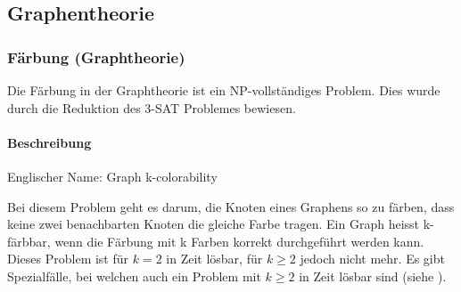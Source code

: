 \subsection{Graphentheorie}\label{graph_theory}

	\subsubsection{Färbung (Graphtheorie)}\label{colarability_graph_theory}
	Die Färbung in der Graphtheorie ist ein NP-vollständiges Problem. Dies wurde durch die Reduktion des 3-SAT Problemes bewiesen.

	\paragraph{Beschreibung}
	Englischer Name: Graph k-colorability

	Bei diesem Problem geht es darum, die Knoten eines Graphens so zu färben, dass keine zwei benachbarten Knoten die gleiche Farbe tragen. Ein Graph heisst k-färbbar, wenn die 
Färbung mit k Farben korrekt durchgeführt werden kann. Dieses Problem ist für $k = 2$ in  Zeit lösbar, für $k \ge 2$ jedoch nicht mehr. Es gibt Spezialfälle, 
bei welchen auch ein Problem mit $k \ge 2$ in  Zeit lösbar sind (siehe \cite{garey1979computers}).

